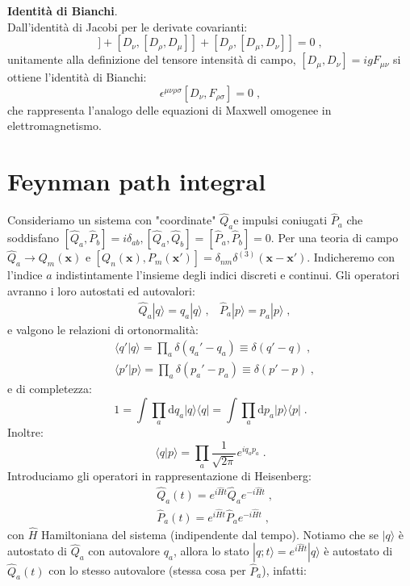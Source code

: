 \documentclass[12pt,a4paper]{article}
\theoremstyle{definition}
\newcommand{\diff}[1][]{\mathrm{d}#1}
\newcommand{\bra}{\langle}
\newcommand{\ket}{\rangle}
\numberwithin{equation}{section}
\begin{document}
\textbf{Identità di Bianchi}. \\
Dall'identità di Jacobi per le derivate covarianti:
\begin{equation}
[D_{\mu},[D_{\nu},D_{\rho}]]+[D_{\nu},[D_{\rho},D_{\mu}]]+[D_{\rho},[D_{\mu},D_{\nu}]]=0\;,
\end{equation}
unitamente alla definizione del tensore intensità di campo, $[D_{\mu},D_{\nu}]= ig F_{\mu\nu}$ si ottiene l'identità di Bianchi:
\begin{equation}
\epsilon^{\mu\nu\rho\sigma}[D_{\nu},F_{\rho\sigma}]=0\;,
\end{equation}
che rappresenta l'analogo delle equazioni di Maxwell omogenee in elettromagnetismo.
\cleardoublepage
\section{Feynman path integral}
Consideriamo un sistema con "coordinate" $\hat{Q}_a$e impulsi coniugati $\hat{P}_a$ che soddisfano $[\hat{Q}_a,\hat{P}_b]=i\delta_{ab},[\hat{Q}_a,\hat{Q}_b]=[\hat{P}_a,\hat{P}_b]=0$. Per una teoria di campo $\hat{Q}_a\to Q_m(\mathbf{x})$ e $[Q_n(\mathbf{x}),P_m(\mathbf{x}')]=\delta_{nm}\delta^{(3)}(\mathbf{x}-\mathbf{x}')$. Indicheremo con l'indice $a$ indistintamente l'insieme degli indici discreti e continui. Gli operatori avranno i loro autostati ed autovalori:
\begin{align}
&\hat{Q}_a|q\ket=q_a|q\ket\;, &\hat{P}_a|p\ket=p_a|p\ket\;,
\end{align}
e valgono le relazioni di ortonormalità:
\begin{align}
&\bra q'|q\ket=\prod_a\delta(q_a'-q_a)\equiv \delta(q'-q)\;, \\
&\bra p'|p\ket=\prod_a\delta(p_a'-p_a)\equiv \delta(p'-p)\;,
\end{align}
e di completezza:
\begin{equation}
1=\int\prod_a\diff{q}_a|q\ket\bra q|=\int\prod_a\diff{p}_a|p\ket\bra p|\;.
\end{equation}
Inoltre:
\begin{equation}
\bra q|p\ket=\prod_a\frac{1}{\sqrt{2\pi}}e^{iq_ap_a}\;.
\end{equation}
Introduciamo gli operatori in rappresentazione di Heisenberg:
\begin{align}
&\hat{Q}_a(t)=e^{i\hat{H}t}\hat{Q}_ae^{-i\hat{H}t}\;, \\
&\hat{P}_a(t)=e^{i\hat{H}t}\hat{P}_ae^{-i\hat{H}t}\;,
\end{align}
con $\hat{H}$ Hamiltoniana del sistema (indipendente dal tempo). Notiamo che se $|q\ket$ è autostato di $\hat{Q}_a$ con autovalore $q_a$, allora lo stato $|q;t\ket=e^{i\hat{H}t}|q\ket$ è autostato di $\hat{Q}_a(t)$ con lo stesso autovalore (stessa cosa per $\hat{P}_a$), infatti:
\end{document}
